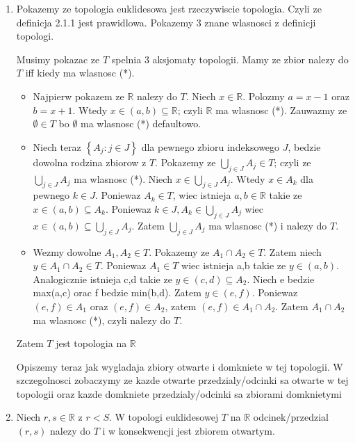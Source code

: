 \documentclass{article}
\begin{document}
\begin{enumerate}[label=(\alph*)] %
    \item Pokazemy ze topologia euklidesowa jest rzeczywiscie topologia. Czyli ze definicja 2.1.1 jest prawidlowa. Pokazemy 3 znane wlasnosci z definicji topologi.

        Musimy pokazac ze $T$ spelnia 3 aksjomaty topologii. Mamy ze zbior nalezy do $T$ iff kiedy ma wlasnosc (*).

        \begin{itemize}
            \item Najpierw pokazem ze $\mathbb{R}$ nalezy do $T$. Niech $x \in \mathbb{R}$. Polozmy $a = x-1$ oraz $b = x+1$. Wtedy $x \in (a,b) \subseteq \mathbb{R}$; czyli $\mathbb{R}$ ma wlasnosc (*). Zauwazmy ze $\emptyset \in T$ bo $\emptyset$ ma wlasnosc (*) defaultowo.
         
            \item Niech teraz $\left\{ A_{j}: j \in J \right\}$ dla pewnego zbioru indeksowego $J$, bedzie dowolna rodzina zbiorow z $T$. Pokazemy ze $\bigcup\limits_{j \in J}A_{j} \in T$; czyli ze $ \bigcup\limits_{j \in J}A_{j}$ ma wlasnosc (*). Niech $x \in \bigcup\limits_{j \in J}A_{j}$. Wtedy $x \in A_{k}$ dla pewnego $k \in J$. Poniewaz $A_{k} \in T$, wiec istnieja $a,b \in \mathbb{R}$ takie ze $x\in (a,b) \subseteq A_{k}$. Poniewaz $k \in J, A_{k} \in   \bigcup\limits_{j \in J}A_{j}$ wiec $x \in (a,b) \subseteq \bigcup\limits_{j \in J}A_{j} $. Zatem $\bigcup\limits_{j \in J}A_{j}$ ma wlasnosc (*) i nalezy do $T$.
           
            \item Wezmy dowolne $A_{1}, A_{2} \in T$. Pokazemy ze $A_{1} \cap A_{2} \in T$. Zatem niech $y \in A_{1} \cap A_{2} \in T$. Poniewaz $A_{1} \in T$ wiec istnieja a,b takie ze $y \in (a,b)$. Analogicznie istnieja c,d takie ze $y \in (c,d) \subseteq A_{2}$. Niech e bedzie max(a,c) orac f bedzie min(b,d). Zatem $y \in (e,f)$. Poniewaz $(e,f) \in A_{1}$ oraz $(e,f) \in A_{2}$, zatem $(e,f) \in A_{1} \cap A_{2}$. Zatem $A_{1} \cap A_{2}$ ma wlasnosc (*), czyli nalezy do $T$.
        \end{itemize}
        Zatem $T$ jest topologia na $\mathbb{ R }$

        Opiszemy teraz jak wygladaja zbiory otwarte i domkniete w tej topologii. W szczegolnosci zobaczymy ze kazde otwarte przedzialy/odcinki sa otwarte w tej topologii oraz kazde domkniete przedzialy/odcinki sa zbiorami domknietymi
    \item Niech $r,s \in \mathbb{R}$ z $r<S$. W topologi euklidesowej $T$ na $\mathbb{R}$ odcinek/przedzial $(r,s)$ nalezy do $T$ i w konsekwencji jest zbiorem otwartym.


\end{enumerate}
\end{document}
